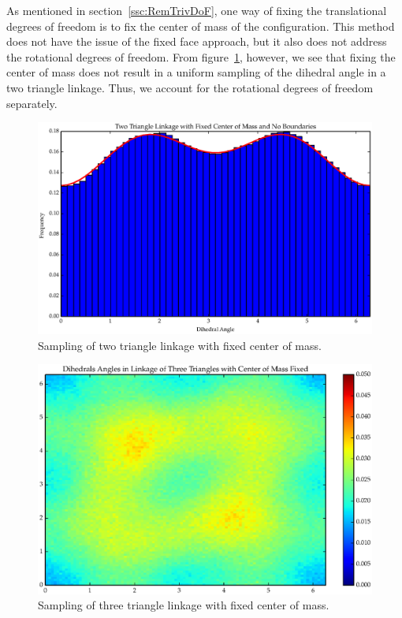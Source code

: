 As mentioned in section~\ref{ssc:RemTrivDoF}, one way of fixing the translational degrees of freedom is to fix the center of mass of the configuration. This method does not have the issue of the fixed face approach, but it also does not address the rotational degrees of freedom. From figure~\ref{fig:T2_4}, however, we see that fixing the center of mass does not result in a uniform sampling of the dihedral angle in a two triangle linkage. Thus, we account for the rotational degrees of freedom separately.  
\begin{figure}[ht]
\centering
  \includegraphics[scale=0.6]{images/T2_4.eps}
\caption{Sampling of two triangle linkage with fixed center of mass.}
\label{fig:T2_4}
\end{figure}

\begin{figure}[ht]
\centering
  \includegraphics[scale=0.6]{images/T3_5_2D.eps}
\caption{Sampling of three triangle linkage with fixed center of mass.}
\label{fig:T3_5}
\end{figure}










